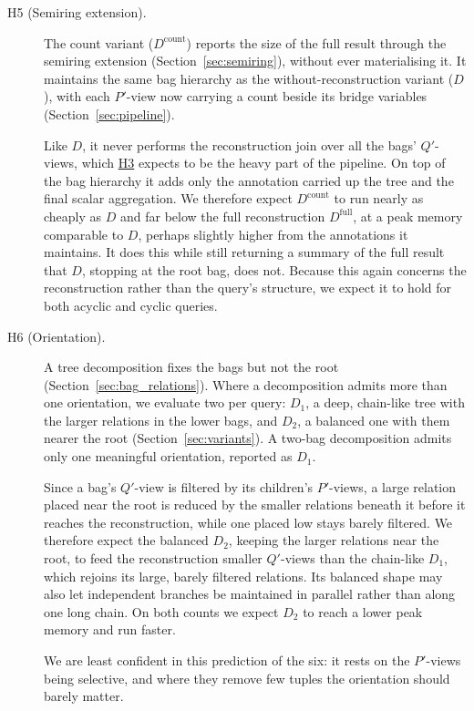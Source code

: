 \begin{description}
    \item[\hypertarget{h5}{H5 (Semiring extension).}] The count variant ($D^{\text{count}}$) reports the size of the full result through the semiring extension (Section~\ref{sec:semiring}), without ever materialising it. It maintains the same bag hierarchy as the without-reconstruction variant ($D$), with each $P'$-view now carrying a count beside its bridge variables (Section~\ref{sec:pipeline}).

    Like $D$, it never performs the reconstruction join over all the bags' $Q'$-views, which \hyperlink{h3}{H3} expects to be the heavy part of the pipeline. On top of the bag hierarchy it adds only the annotation carried up the tree and the final scalar aggregation. We therefore expect $D^{\text{count}}$ to run nearly as cheaply as $D$ and far below the full reconstruction $D^{\text{full}}$, at a peak memory comparable to $D$, perhaps slightly higher from the annotations it maintains. It does this while still returning a summary of the full result that $D$, stopping at the root bag, does not. Because this again concerns the reconstruction rather than the query's structure, we expect it to hold for both acyclic and cyclic queries.

    \item[\hypertarget{h6}{H6 (Orientation).}] A tree decomposition fixes the bags but not the root (Section~\ref{sec:bag_relations}). Where a decomposition admits more than one orientation, we evaluate two per query: $D_1$, a deep, chain-like tree with the larger relations in the lower bags, and $D_2$, a balanced one with them nearer the root (Section~\ref{sec:variants}). A two-bag decomposition admits only one meaningful orientation, reported as $D_1$.

    Since a bag's $Q'$-view is filtered by its children's $P'$-views, a large relation placed near the root is reduced by the smaller relations beneath it before it reaches the reconstruction, while one placed low stays barely filtered. We therefore expect the balanced $D_2$, keeping the larger relations near the root, to feed the reconstruction smaller $Q'$-views than the chain-like $D_1$, which rejoins its large, barely filtered relations. Its balanced shape may also let independent branches be maintained in parallel rather than along one long chain. On both counts we expect $D_2$ to reach a lower peak memory and run faster.

    We are least confident in this prediction of the six: it rests on the $P'$-views being selective, and where they remove few tuples the orientation should barely matter.
\end{description}

